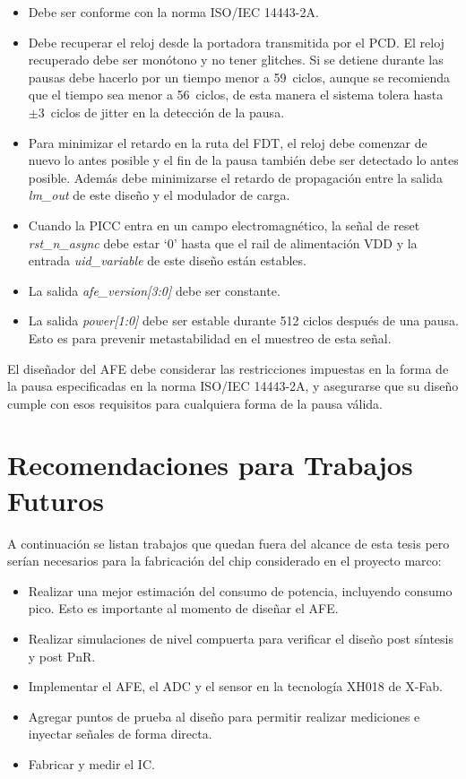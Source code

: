 \documentclass[a4paper, twoside, 11pt]{report}
\begin{document}
\begin{itemize}
  \item Debe ser conforme con la norma ISO/IEC 14443-2A.
  \item Debe recuperar el reloj desde la portadora transmitida por el PCD. El reloj recuperado debe ser monótono y no tener glitches. Si se detiene durante las pausas debe hacerlo por un tiempo menor a 59~ciclos, aunque se recomienda que el tiempo sea menor a 56~ciclos, de esta manera el sistema tolera hasta $\pm 3$~ciclos de jitter en la detección de la pausa.
  \item Para minimizar el retardo en la ruta del FDT, el reloj debe comenzar de nuevo lo antes posible y el fin de la pausa también debe ser detectado lo antes posible. Además debe minimizarse el retardo de propagación entre la salida \textit{lm\_out} de este diseño y el modulador de carga.
  \item Cuando la PICC entra en un campo electromagnético, la señal de reset \textit{rst\_n\_async} debe estar ‘0’ hasta que el rail de alimentación VDD y la entrada \textit{uid\_variable} de este diseño están estables.
  \item La salida \textit{afe\_version[3:0]} debe ser constante.
  \item La salida \textit{power[1:0]} debe ser estable durante 512 ciclos después de una pausa. Esto es para prevenir metastabilidad en el muestreo de esta señal.
\end{itemize}

El diseñador del AFE debe considerar las restricciones impuestas en la forma de la pausa especificadas en la norma ISO/IEC 14443-2A, y asegurarse que su diseño cumple con esos requisitos para cualquiera forma de la pausa válida.

\FloatBarrier
\section{Recomendaciones para Trabajos Futuros}

A continuación se listan trabajos que quedan fuera del alcance de esta tesis pero serían necesarios para la fabricación del chip considerado en el proyecto marco:

\begin{itemize}
  \item Realizar una mejor estimación del consumo de potencia, incluyendo consumo pico. Esto es importante al momento de diseñar el AFE.
  \item Realizar simulaciones de nivel compuerta para verificar el diseño post síntesis y post PnR.
  \item Implementar el AFE, el ADC y el sensor en la tecnología XH018 de X-Fab.
  \item Agregar puntos de prueba al diseño para permitir realizar mediciones e inyectar señales de forma directa.
  \item Fabricar y medir el IC.
\end{itemize}
\end{document}
